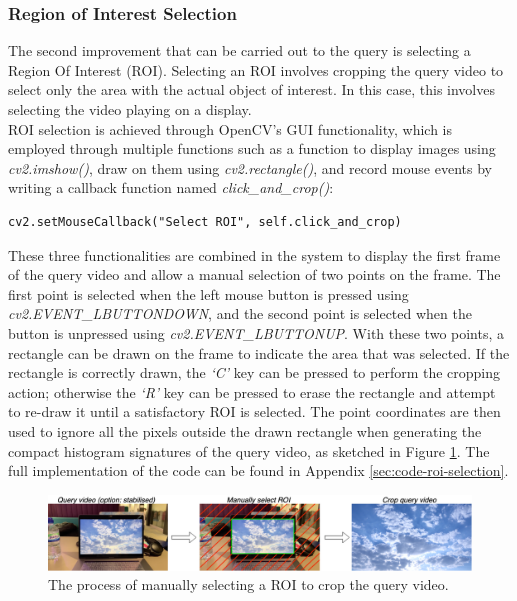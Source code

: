 \subsubsection{Region of Interest Selection}

The second improvement that can be carried out to the query is selecting a Region Of Interest (ROI). Selecting an ROI involves cropping the query video to select only the area with the actual object of interest. In this case, this involves selecting the video playing on a display.\\

ROI selection is achieved through OpenCV's GUI functionality, which is employed through multiple functions such as a function to display images using \textit{cv2.imshow()}, draw on them using \textit{cv2.rectangle()}, and record mouse events by writing a callback function named \textit{click\_and\_crop()}:

\begin{lstlisting}
cv2.setMouseCallback("Select ROI", self.click_and_crop)
\end{lstlisting}

These three functionalities are combined in the system to display the first frame of the query video and allow a manual selection of two points on the frame. The first point is selected when the left mouse button is pressed using \textit{cv2.EVENT\_LBUTTONDOWN}, and the second point is selected when the button is unpressed using \textit{cv2.EVENT\_LBUTTONUP}. With these two points, a rectangle can be drawn on the frame to indicate the area that was selected. If the rectangle is correctly drawn, the \textit{`C'} key can be pressed to perform the cropping action; otherwise the \textit{`R'} key can be pressed to erase the rectangle and attempt to re-draw it until a satisfactory ROI is selected. The point coordinates are then used to ignore all the pixels outside the drawn rectangle when generating the compact histogram signatures of the query video, as sketched in Figure \ref{fig:implementation-roi_selection}. The full implementation of the code can be found in Appendix \ref{sec:code-roi-selection}.\\

\begin{figure}[h] 
\centerline{\includegraphics[width=\textwidth]{figures/implementation/roi_selection.png}}
\caption{\label{fig:implementation-roi_selection}The process of manually selecting a ROI to crop the query video.}
\end{figure}

